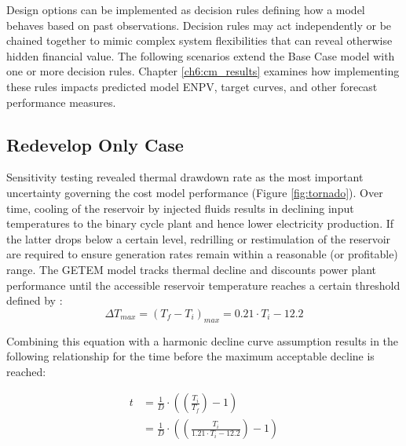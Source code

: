 Design options can be implemented as decision rules defining how a model behaves based on past observations. Decision rules may act independently or be chained together to mimic complex system flexibilities that can reveal otherwise hidden financial value. The following scenarios extend the Base Case model with one or more decision rules. Chapter \ref{ch6:cm_results} examines how implementing these rules impacts predicted model ENPV, target curves, and other forecast performance measures.

\subsection{Redevelop Only Case}\label{ch4:flex_redevelop_case}
Sensitivity testing revealed thermal drawdown rate as the most important uncertainty governing the cost model performance (Figure \ref{fig:tornado}). Over time, cooling of the reservoir by injected fluids results in declining input temperatures to the binary cycle plant and hence lower electricity production. If the latter drops below a certain level, redrilling or restimulation of the reservoir are required to ensure generation rates remain within a reasonable (or profitable) range. The GETEM model tracks thermal decline and discounts power plant performance until the accessible reservoir temperature reaches a certain threshold defined by \citep{entingh_volume_2006}:
\begin{equation}
\label{eq:drawdown_threshold}
    \Delta T_{max} = (T_f-T_i)_{max} = 0.21 \cdot T_i - 12.2
\end{equation}

Combining this equation with a harmonic decline curve assumption results in the following relationship for the time before the maximum acceptable decline is reached:

\begin{equation}
\label{eq:redevelop_time}
\begin{aligned}
    t &= \frac{1}{D} \cdot 
    \left( {
    \left( {\frac{T_i}{T_f} }\right) - 1
    }\right)\\
    &= \frac{1}{D} \cdot 
    \left( {
    \left( {\frac{T_i}{1.21 \cdot T_i - 12.2}
    }\right) - 1
    }\right) 
\end{aligned}
\end{equation}

